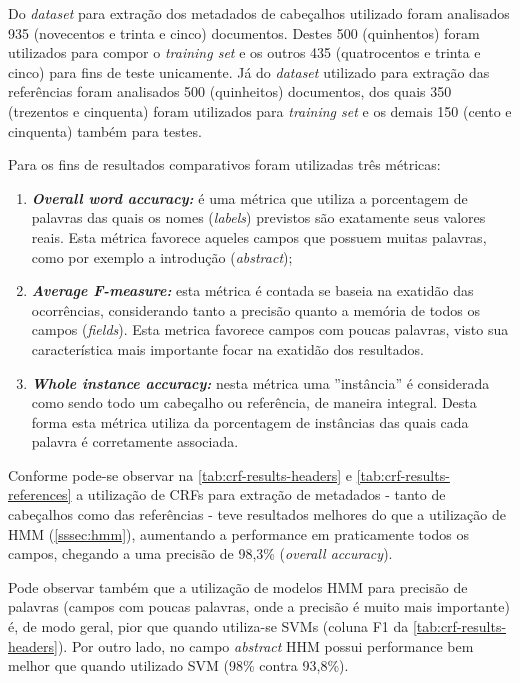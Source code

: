 \begin{textnew}
Do \emph{dataset} para extração dos metadados de cabeçalhos utilizado foram analisados 935 (novecentos e trinta e cinco) documentos. Destes 500 (quinhentos) foram utilizados para compor o \emph{training set} e os outros 435 (quatrocentos e trinta e cinco) para fins de teste unicamente. Já do \emph{dataset} utilizado para extração das referências foram analisados 500 (quinheitos) documentos, dos quais 350 (trezentos e cinquenta) foram utilizados para \emph{training set} e os demais 150 (cento e cinquenta) também para testes.

Para os fins de resultados comparativos foram utilizadas três métricas:

\begin{enumerate}
    \item \emph{\textbf{Overall word accuracy:}} é uma métrica que utiliza a porcentagem de palavras das quais os nomes (\emph{labels}) previstos são exatamente seus valores reais. Esta métrica favorece aqueles campos que possuem muitas palavras, como por exemplo a introdução (\emph{abstract});
    \item \emph{\textbf{Average F-measure:}} esta métrica é contada se baseia na exatidão das ocorrências, considerando tanto a precisão quanto a memória de todos os campos (\emph{fields}). Esta metrica favorece campos com poucas palavras, visto sua característica mais importante focar na exatidão dos resultados.
    \item \emph{\textbf{Whole instance accuracy:}} nesta métrica uma ''instância'' é considerada como sendo todo um cabeçalho ou referência, de maneira integral. Desta forma esta métrica utiliza da porcentagem de instâncias das quais cada palavra é corretamente associada.
\end{enumerate}

Conforme pode-se observar na \autoref{tab:crf-results-headers} e \autoref{tab:crf-results-references} a utilização de CRFs para extração de metadados - tanto de cabeçalhos como das referências - teve resultados melhores do que a utilização de HMM (\autoref{sssec:hmm}), aumentando a performance em praticamente todos os campos, chegando a uma precisão de 98,3\% (\emph{overall accuracy}).

Pode observar também que a utilização de modelos HMM para precisão de palavras (campos com poucas palavras, onde a precisão é muito mais importante) é, de modo geral, pior que quando utiliza-se SVMs (coluna F1 da \autoref{tab:crf-results-headers}). Por outro lado, no campo \emph{abstract} HHM possui performance bem melhor que quando utilizado SVM (98\% contra 93,8\%).


\end{textnew}
